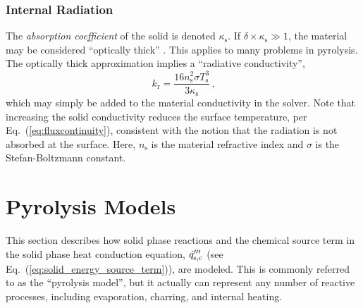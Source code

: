 
\subsubsection*{Internal Radiation}
\label{sec:radiation}

The \emph{absorption coefficient} of the solid is denoted $\kappa_{\mathrm{s}}$.  If $\delta \times \kappa_{\mathrm{s}} \gg 1$, the material may be considered ``optically thick'' \cite{Modest:2003}.  This applies to many problems in pyrolysis.  The optically thick approximation implies a ``radiative conductivity'',
\begin{equation}
\label{eq:krad}
k_{\mathrm{r}} = \frac{16 n_{\mathrm{s}}^2 \sigma T_{\mathrm{s}}^3}{3 \kappa_{\mathrm{s}}} \,\mbox{,}
\end{equation}
which may simply be added to the material conductivity in the solver. Note that increasing the solid conductivity reduces the surface temperature, per Eq.~(\ref{eq:fluxcontinuity}), consistent with the notion that the radiation is not absorbed at the surface. Here, $n_{\mathrm{s}}$ is the material refractive index and $\sigma$ is the Stefan-Boltzmann constant.


\newpage
\section{Pyrolysis Models}
\label{pyrosection}

This section describes how solid phase reactions and the chemical source term in the solid phase heat conduction equation, $\dot{q}_{\rm s,c}'''$ (see Eq.~(\ref{eq:solid_energy_source_term})),  are modeled. This is commonly referred to as the ``pyrolysis model'', but it actually can represent any number of reactive processes, including evaporation, charring, and internal heating.


